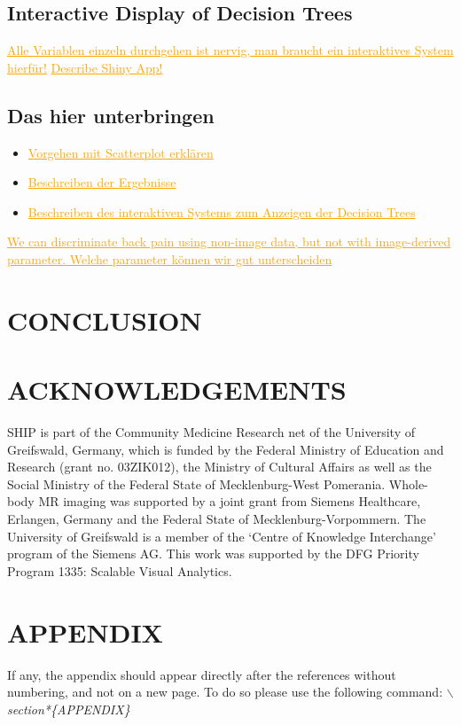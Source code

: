 \documentclass[a4paper,twoside]{style/article}
\newcommand{\com}[1]{\textcolor{orange}{\uline{#1}}}
\begin{document}
\subsection{Interactive Display of Decision Trees}
\com{Alle Variablen einzeln durchgehen ist nervig, man braucht ein interaktives System hierfür!}
\com{Describe Shiny App!}

\subsection{Das hier unterbringen}
\begin{itemize}
\item \com{Vorgehen mit Scatterplot erklären}
\item \com{Beschreiben der Ergebnisse}
\item \com{Beschreiben des interaktiven Systems zum Anzeigen der Decision Trees}
\end{itemize}

\com{We can discriminate back pain using non-image data, but not with image-derived parameter. Welche parameter können wir gut unterscheiden}

\section{\uppercase{Conclusion}}
\label{sec:Conclusion}

\section*{\uppercase{Acknowledgements}}

\noindent SHIP is part of the Community Medicine Research net of the University of Greifswald, Germany, which is funded by the Federal Ministry of Education and Research (grant no. 03ZIK012), the Ministry of Cultural Affairs as well as the Social Ministry of the Federal State of Mecklenburg-West Pomerania. Whole-body MR imaging was supported by a joint grant from Siemens Healthcare, Erlangen, Germany and the Federal State of Mecklenburg-Vorpommern. The University of Greifswald is a member of the ‘Centre of Knowledge Interchange’ program of the Siemens AG. This work was supported by the DFG Priority Program 1335: Scalable Visual Analytics.


\vfill

{\small
}


\section*{\uppercase{Appendix}}

\noindent If any, the appendix should appear directly after the
references without numbering, and not on a new page. To do so please use the following command:
\textit{$\backslash$section*\{APPENDIX\}}

\vfill
\end{document}
